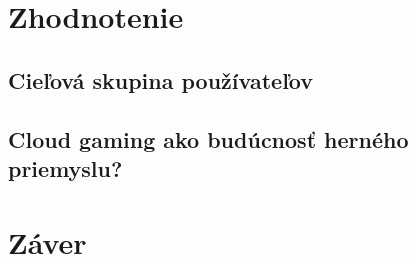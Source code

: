 \documentclass[10pt,twoside,slovak,a4paper]{article}
\begin{document}
\section{Zhodnotenie}

\subsection{Cieľová skupina používateľov}

\subsection{Cloud gaming ako budúcnosť herného priemyslu?}



\section{Záver}






\end{document}
